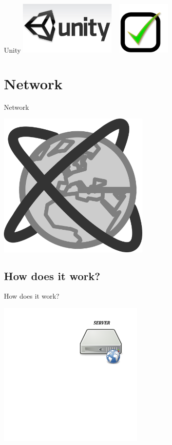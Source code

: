 \documentclass[a4paper,10pt]{beamer}
\begin{document}
			\begin{frame}{Unity}
				\includegraphics[height=75pt]{images/logos/Logo_Unity.jpg}
				\mbox{ }
				\includegraphics[height=75pt]{images/validated.png}
			\end{frame}
		
	\section{Network}
		
		\begin{frame}{Network}
			\centerline{\includegraphics[height=205pt]{images/network/network.png}}
		\end{frame}
		
		\subsection{How does it work?}
		
			\begin{frame}{How does it work?}
				\centerline{\includegraphics[height=205pt]{images/network/server.png}}
			\end{frame}
		
\end{document}
